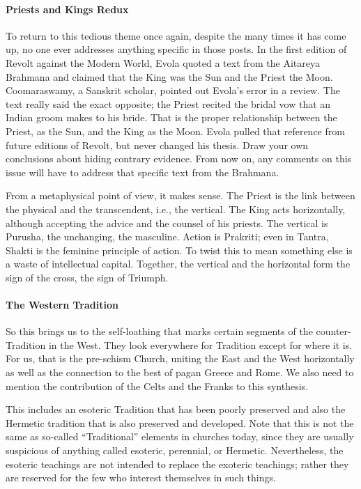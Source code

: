 \paragraph{Priests and Kings Redux}


To return to this tedious theme once again, despite the many times it has come up, no one ever addresses anything specific in those posts. In the first edition of Revolt against the Modern World, Evola quoted a text from the Aitareya Brahmana and claimed that the King was the Sun and the Priest the Moon. Coomaraswamy, a Sanskrit scholar, pointed out Evola's error in a review. The text really said the exact opposite; the Priest recited the bridal vow that an Indian groom makes to his bride. That is the proper relationship between the Priest, as the Sun, and the King as the Moon. Evola pulled that reference from future editions of Revolt, but never changed his thesis. Draw your own conclusions about hiding contrary evidence. From now on, any comments on this issue will have to address that specific text from the Brahmana.

From a metaphysical point of view, it makes sense. The Priest is the link between the physical and the transcendent, i.e., the vertical. The King acts horizontally, although accepting the advice and the counsel of his priests. The vertical is Purusha, the unchanging, the masculine. Action is Prakriti; even in Tantra, Shakti is the feminine principle of action. To twist this to mean something else is a waste of intellectual capital. Together, the vertical and the horizontal form the sign of the cross, the sign of Triumph.

\paragraph{The Western Tradition}


So this brings us to the self-loathing that marks certain segments of the counter-Tradition in the West. They look everywhere for Tradition except for where it is. For us, that is the pre-schism Church, uniting the East and the West horizontally as well as the connection to the best of pagan Greece and Rome. We also need to mention the contribution of the Celts and the Franks to this synthesis.

This includes an esoteric Tradition that has been poorly preserved and also the Hermetic tradition that is also preserved and developed. Note that this is not the same as so-called ``Traditional'' elements in churches today, since they are usually suspicious of anything called esoteric, perennial, or Hermetic. Nevertheless, the esoteric teachings are not intended to replace the exoteric teachings; rather they are reserved for the few who interest themselves in such things.


